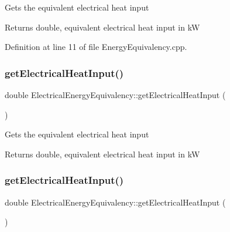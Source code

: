 Gets the equivalent electrical heat input \begin{DoxyReturn}{Returns}
double, equivalent electrical heat input in kW 
\end{DoxyReturn}


Definition at line 11 of file Energy\+Equivalency.\+cpp.

\mbox{\label{class_electrical_energy_equivalency_aac8365a7d5b4e111ddbe7fc0c9beecc7}} 
\subsubsection{\texorpdfstring{get\+Electrical\+Heat\+Input()}{getElectricalHeatInput()}\hspace{0.1cm}{\footnotesize\ttfamily [2/3]}}
{\footnotesize\ttfamily double Electrical\+Energy\+Equivalency\+::get\+Electrical\+Heat\+Input (\begin{DoxyParamCaption}{ }\end{DoxyParamCaption})}

Gets the equivalent electrical heat input \begin{DoxyReturn}{Returns}
double, equivalent electrical heat input in kW 
\end{DoxyReturn}
\mbox{\label{class_electrical_energy_equivalency_aac8365a7d5b4e111ddbe7fc0c9beecc7}} 
\subsubsection{\texorpdfstring{get\+Electrical\+Heat\+Input()}{getElectricalHeatInput()}\hspace{0.1cm}{\footnotesize\ttfamily [3/3]}}
{\footnotesize\ttfamily double Electrical\+Energy\+Equivalency\+::get\+Electrical\+Heat\+Input (\begin{DoxyParamCaption}{ }\end{DoxyParamCaption})}

